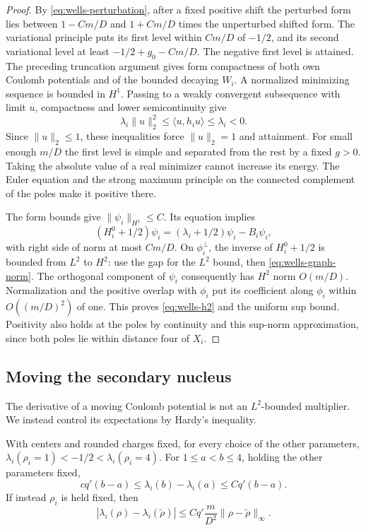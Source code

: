 \begin{proof}
By \eqref{eq:wells-perturbation}, after a fixed positive shift the
perturbed form lies between \(1-Cm/D\) and \(1+Cm/D\) times the
unperturbed shifted form. The variational principle puts its first
level within \(Cm/D\) of \(-1/2\), and its second variational level at
least \(-1/2+g_0-Cm/D\). The negative first level is attained.
The preceding truncation argument gives form compactness of both own
Coulomb potentials and of the bounded decaying \(W_i\). A normalized
minimizing sequence is bounded in \(H^1\). Passing to a weakly convergent
subsequence with limit \(u\), compactness and lower semicontinuity give
\[
 \lambda_i\|u\|_2^2\le\langle u,h_i u\rangle\le\lambda_i<0.
\]
Since \(\|u\|_2\le1\), these inequalities force \(\|u\|_2=1\)
and attainment. For small enough \(m/D\) the
first level is simple and separated from the rest by a fixed \(g>0\).
Taking the absolute value of a real minimizer cannot increase its
energy. The Euler equation and the strong maximum principle on the
connected complement of the poles make it positive there.

The form bounds give \(\|\psi_i\|_{H^1}\le C\). Its equation implies
\[
 (H_i^0+1/2)\psi_i
   =(\lambda_i+1/2)\psi_i-B_i\psi_i,
\]
with right side of norm at most \(Cm/D\). On \(\phi_i^\perp\), the inverse
of \(H_i^0+1/2\) is bounded from \(L^2\) to \(H^2\): use the gap for the
\(L^2\) bound, then \eqref{eq:wells-graph-norm}.
The orthogonal component of \(\psi_i\) consequently has \(H^2\) norm
\(O(m/D)\). Normalization and the positive overlap with \(\phi_i\) put
its coefficient along \(\phi_i\) within \(O((m/D)^2)\) of one.
This proves \eqref{eq:wells-h2} and the uniform sup bound. Positivity
also holds at the poles by continuity and this sup-norm approximation,
since both poles lie within distance four of \(X_i\).
\end{proof}

\subsection{Moving the secondary nucleus}

The derivative of a moving Coulomb potential is not an \(L^2\)-bounded
multiplier. We instead control its expectations by Hardy's inequality.

\begin{lemma}
\label{lem:wells-secants}
With centers and rounded charges fixed, for every choice of the other
parameters,
\(\lambda_i(\rho_i=1)<-1/2<\lambda_i(\rho_i=4)\).
For \(1\le a<b\le4\), holding the other parameters fixed,
\begin{equation}
 c q'(b-a)\le\lambda_i(b)-\lambda_i(a)\le Cq'(b-a).
 \label{eq:wells-own-slope}
\end{equation}
If instead \(\rho_i\) is held fixed, then
\begin{equation}
 |\lambda_i(\rho)-\lambda_i(\widetilde\rho)|
 \le Cq'\frac m{D^2}\|\rho-\widetilde\rho\|_\infty.
 \label{eq:wells-other-slope}
\end{equation}
\end{lemma}

